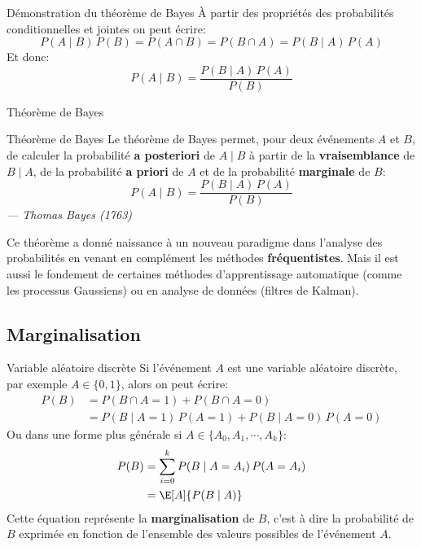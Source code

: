 \begin{frame}{Démonstration du théorème de Bayes}
	\`A partir des propriétés des probabilités conditionnelles et jointes on peut écrire:
	\begin{equation}
		P(A \mid B) \, P(B) = P(A \cap B) = P(B \cap A) = P(B \mid A) \, P(A)
		\nonumber
	\end{equation}
	Et donc:
	\begin{equation}
		P(A \mid B) = \frac{P(B \mid A) \, P(A)}{P(B)}
		\nonumber
	\end{equation}
\end{frame}

\begin{frame}{Théorème de Bayes}
	\begin{block}{Théorème de Bayes}
		Le théorème de Bayes permet, pour deux événements $A$ et $B$, de calculer la probabilité \textbf{a posteriori} de $A \mid B$ à partir de la \textbf{vraisemblance} de $B \mid A$, de la probabilité \textbf{a priori} de $A$ et de la probabilité \textbf{marginale} de $B$:
		\begin{equation}
			P(A \mid B) = \displaystyle \frac{P(B \mid A) \, P(A)}{P(B)}
			\nonumber
		\end{equation}
		\hfill
		\textit{--- Thomas Bayes (1763)}
	\end{block}
	\pause
	Ce théorème a donné naissance à un nouveau paradigme dans l'analyse des probabilités en venant en complément les méthodes \textbf{fréquentistes}. Mais il est aussi le fondement de certaines méthodes d'apprentissage automatique (comme les processus Gaussiens) ou en analyse de données (filtres de Kalman). 
\end{frame}

\subsection{Marginalisation}

\begin{frame}{Variable aléatoire discrète}
	Si l'événement $A$ est une variable aléatoire discrète, par exemple $A \in \{0, 1\}$, alors on peut écrire:
	\begin{equation}
		\begin{aligned}
			P(B) &= P(B \cap A=1) + P(B \cap A=0) \\
			&= P(B \mid A=1) \, P(A=1) + P(B \mid A=0) \, P(A=0)
		\end{aligned}
		\nonumber 
	\end{equation}
	\pause
	Ou dans une forme plus générale si $A \in \{A_0, A_1, \cdots, A_k\}$:
	\begin{equation}
		\begin{aligned}
			P(B) &= \sum_{i=0}^k P(B \mid A=A_i) \, P(A=A_i) \\
			&= \E[A]{P(B \mid A)}
		\end{aligned}
		\nonumber
	\end{equation}
	\pause
	Cette équation représente la \textbf{marginalisation} de $B$, c'est à dire la probabilité de $B$ exprimée en fonction de l'ensemble des valeurs possibles de l'événement $A$.
\end{frame}

